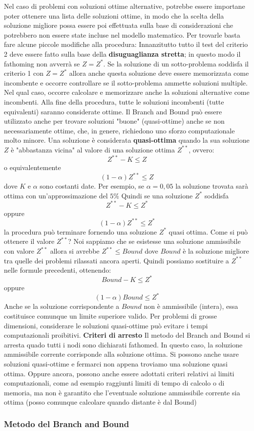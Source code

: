 \documentclass[12pt]{article}
\begin{document}
Nel caso di problemi con soluzioni ottime alternative, potrebbe essere importane poter ottenere una lista delle soluzioni ottime, in modo che la scelta della soluzione migliore possa essere poi effettuata sulla base di considerazioni
che potrebbero non essere state incluse nel modello matematico. Per trovarle basta fare alcune piccole modifiche alla procedura: \newline
Innanzitutto tutto il test del criterio 2 deve essere fatto sulla base della \textbf{disuguaglianza stretta}; in questo modo il fathoming non avverrà se $Z = Z^*$.
Se la soluzione di un sotto-problema soddisfa il criterio 1 con $Z = Z^*$ allora anche questa soluzione deve essere memorizzata come incombente e occorre controllare se il sotto-problema ammette soluzioni
multiple. Nel qual caso, occorre calcolare e memorizzare anche la soluzioni alternative come incombenti.
Alla fine della procedura, tutte le soluzioni incombenti (tutte equivalenti) saranno considerate ottime. \newline
Il Branch and Bound può essere utilizzato anche per trovare soluzioni "buone" (quasi-ottime) anche se non necessariamente ottime, che, in genere,
richiedono uno sforzo computazionale molto minore. Una soluzione è considerata \textbf{quasi-ottima} quando la sua soluzione $Z$ è "abbastanza vicina" al valore di una soluzione
ottima $Z^{**}$, ovvero:
$$Z^{**} - K \leq Z$$
o equivalentemente
$$(1-\alpha)Z^{**} \leq Z$$
dove $K$ e $\alpha$ sono costanti date.
Per esempio, se $\alpha = 0,05$ la soluzione trovata sarà ottima con un'approssimazione del $5\%$
Quindi se una soluzione $Z^*$ soddisfa
$$Z^{**} - K \leq Z^*$$
oppure
$$(1-\alpha)Z^{**} \leq Z^*$$
la procedura può terminare fornendo una soluzione $Z^*$ quasi ottima. \newline
Come si può ottenere il valore $Z^{**}$?
Noi sappiamo che se esistesse una soluzione ammissibile con valore $Z^{**}$ allora si avrebbe $Z^{**} \leq Bound$
dove $Bound$ è la soluzione migliore tra quelle dei problemi rilassati ancora aperti.
Quindi possiamo sostituire a $Z^{**}$ nelle formule precedenti, ottenendo:
$$Bound - K \leq Z^{*}$$
oppure
$$(1- \alpha)Bound \leq Z^*$$
Anche se la soluzione corrispondente a $Bound$ non è ammissibile (intera), essa costituisce comunque  un limite superiore valido.
Per problemi di grosse dimensioni, considerare le soluzioni quasi-ottime può evitare i tempi computazionali proibitivi. \newline
\textbf{Criteri di arresto} \newline
Il metodo del Branch and Bound si arresta quado tutti i nodi sono dichiarati fathomed.
In questo caso, la soluzione ammissibile corrente corrisponde alla soluzione ottima.
Si possono anche usare soluzioni quasi-ottime e fermarci non appena troviamo una soluzione quasi ottima.
Oppure ancora, possono anche essere adottati criteri relativi ai limiti computazionali, come ad esempio raggiunti limiti di tempo
di calcolo o di memoria, ma non è garantito che l'eventuale soluzione ammissibile corrente sia ottima (posso comunque calcolare quando distante è dal Bound)
\subsubsection{Metodo del Branch and Bound}
\end{document}
